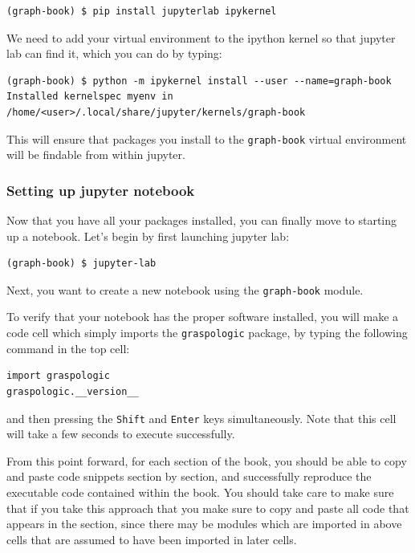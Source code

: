 \begin{lstlisting}[style=bash]
(graph-book) $ pip install jupyterlab ipykernel
\end{lstlisting}

We need to add your virtual environment to the ipython kernel so that jupyter lab can find it, which you can do by typing:


\begin{lstlisting}[style=bash]
(graph-book) $ python -m ipykernel install --user --name=graph-book
Installed kernelspec myenv in /home/<user>/.local/share/jupyter/kernels/graph-book
\end{lstlisting}

This will ensure that packages you install to the \texttt{graph-book} virtual environment will be findable from within jupyter.

\subsubsection{Setting up jupyter notebook}

Now that you have all your packages installed, you can finally move to starting up a notebook. Let's begin by first launching jupyter lab:

\begin{lstlisting}[style=bash]
(graph-book) $ jupyter-lab

\end{lstlisting}

Next, you want to create a new notebook using the \texttt{graph-book} module.

To verify that your notebook has the proper software installed, you will make a code cell which simply imports the \texttt{graspologic} package, by typing the following command in the top cell:

\begin{lstlisting}[style=bash]
import graspologic
graspologic.__version__
\end{lstlisting}

and then pressing the \texttt{Shift} and \texttt{Enter} keys simultaneously. Note that this cell will take a few seconds to execute successfully.


From this point forward, for each section of the book, you should be able to copy and paste code snippets section by section, and successfully reproduce the executable code contained within the book. You should take care to make sure that if you take this approach that you make sure to copy and paste all code that appears in the section, since there may be modules which are imported in above cells that are assumed to have been imported in later cells.

\newpage